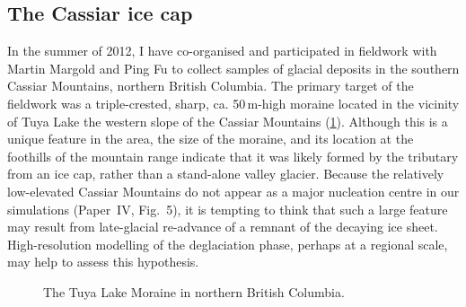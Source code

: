 \documentclass{article}
\newcommand{\CCYC}[0]{Paper~IV}     %
\begin{document}
\subsection{The Cassiar ice cap}

In the summer of 2012, I have co-organised and participated in fieldwork with
Martin Margold and Ping Fu to collect samples of glacial deposits in the
southern Cassiar Mountains, northern British Columbia. The primary target of
the fieldwork was a triple-crested, sharp, ca. 50\,m-high moraine located in
the vicinity of Tuya Lake the western slope of the Cassiar Mountains
(\cref{fig:photo-tuya-moraine}). Although this is a unique feature in the area,
the size of the moraine, and its location at the foothills of the mountain
range indicate that it was likely formed by the tributary from an ice cap,
rather than a stand-alone valley glacier. Because the relatively low-elevated
Cassiar Mountains do not appear as a major nucleation centre in our simulations
(\CCYC, Fig.~5), it is tempting to think that such a large feature may result
from late-glacial re-advance of a remnant of the decaying ice sheet.
High-resolution modelling of the deglaciation phase, perhaps at a regional
scale, may help to assess this hypothesis.

\begin{figure}
  \centering
  \caption{The Tuya Lake Moraine in northern British Columbia.}
  \label{fig:photo-tuya-moraine}
\end{figure}

\renewcommand{\urlprefix}[0]{}  %



\end{document}
